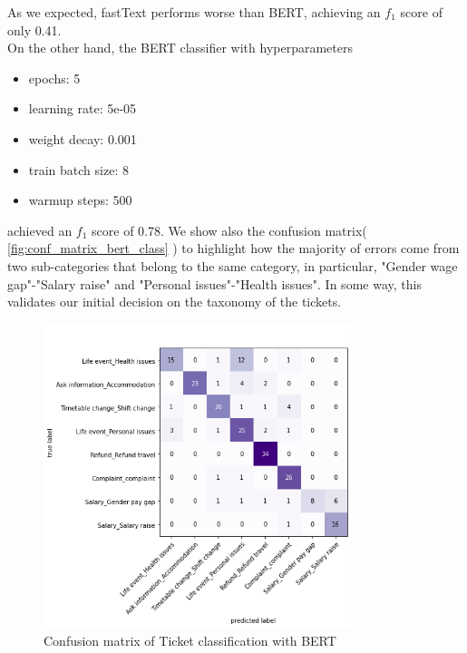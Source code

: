 As we expected, fastText performs worse than BERT, achieving an $f_1$ score of only 0.41. \\
On the other hand, the BERT classifier with hyperparameters\begin{itemize}
  \item epochs: 5
  \item learning rate: 5e-05
  \item weight decay: 0.001
  \item train batch size: 8
  \item warmup steps: 500
\end{itemize}
achieved an $f_1$ score of 0.78. We show also the confusion matrix( \autoref{fig:conf_matrix_bert_class} ) to highlight how the majority of errors come from two sub-categories that belong to the same category, in particular, "Gender wage gap"-"Salary raise" and "Personal issues"-"Health issues". In some way, this validates our initial decision on the taxonomy of the tickets.
\begin{figure}[h] 
  \centering
  \includegraphics[width=0.8\textwidth]{images/conf_matrix_bert_class.png}
  \caption{Confusion matrix of Ticket classification with BERT}
  \label{fig:conf_matrix_bert_class}
\end{figure}    
